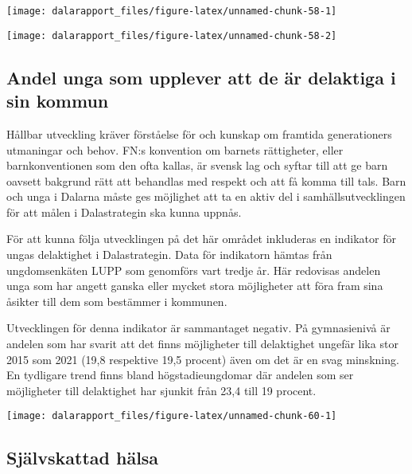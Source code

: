 \documentclass[
]{article}
\begin{document}
\begin{center}\texttt{[image: dalarapport\_files/figure-latex/unnamed-chunk-58-1]} \end{center}

\begin{center}\texttt{[image: dalarapport\_files/figure-latex/unnamed-chunk-58-2]} \end{center}

\hypertarget{andel-unga-som-upplever-att-de-uxe4r-delaktiga-i-sin-kommun}{%
\subsection{Andel unga som upplever att de är delaktiga i sin
kommun}\label{andel-unga-som-upplever-att-de-uxe4r-delaktiga-i-sin-kommun}}

Hållbar utveckling kräver förståelse för och kunskap om framtida
generationers utmaningar och behov. FN:s konvention om barnets
rättigheter, eller barnkonventionen som den ofta kallas, är svensk lag
och syftar till att ge barn oavsett bakgrund rätt att behandlas med
respekt och att få komma till tals. Barn och unga i Dalarna måste ges
möjlighet att ta en aktiv del i samhällsutvecklingen för att målen i
Dalastrategin ska kunna uppnås.

För att kunna följa utvecklingen på det här området inkluderas en
indikator för ungas delaktighet i Dalastrategin. Data för indikatorn
hämtas från ungdomsenkäten LUPP som genomförs vart tredje år. Här
redovisas andelen unga som har angett ganska eller mycket stora
möjligheter att föra fram sina åsikter till dem som bestämmer i
kommunen.

Utvecklingen för denna indikator är sammantaget negativ. På gymnasienivå
är andelen som har svarit att det finns möjligheter till delaktighet
ungefär lika stor 2015 som 2021 (19,8 respektive 19,5 procent) även om
det är en svag minskning. En tydligare trend finns bland
högstadieungdomar där andelen som ser möjligheter till delaktighet har
sjunkit från 23,4 till 19 procent.

\begin{center}\texttt{[image: dalarapport\_files/figure-latex/unnamed-chunk-60-1]} \end{center}

\hypertarget{sjuxe4lvskattad-huxe4lsa}{%
\subsection{Självskattad hälsa}\label{sjuxe4lvskattad-huxe4lsa}}
\end{document}
